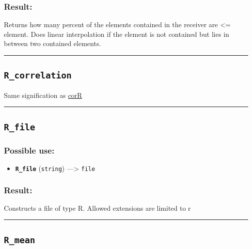 \documentclass[]{book}
\providecommand{\tightlist}{%
  \setlength{\itemsep}{0pt}\setlength{\parskip}{0pt}}
\theoremstyle{definition}
\theoremstyle{definition}
\theoremstyle{definition}
\theoremstyle{remark}
\begin{document}
\subsubsection{Result:}\label{result-411}

Returns how many percent of the elements contained in the receiver are
\textless{}= element. Does linear interpolation if the element is not
contained but lies in between two contained elements.

\begin{center}\rule{0.5\linewidth}{\linethickness}\end{center}

\subsection{\texorpdfstring{\texttt{R\_correlation}}{R\_correlation}}\label{r_correlation}

Same signification as \href{OperatorsBC\#corR}{corR}

\begin{center}\rule{0.5\linewidth}{\linethickness}\end{center}

\subsection{\texorpdfstring{\texttt{R\_file}}{R\_file}}\label{r_file}

\subsubsection{Possible use:}\label{possible-use-426}

\begin{itemize}
\tightlist
\item
  \textbf{\texttt{R\_file}} (\texttt{string}) ---\textgreater{}
  \texttt{file}
\end{itemize}

\subsubsection{Result:}\label{result-412}

Constructs a file of type R. Allowed extensions are limited to r

\begin{center}\rule{0.5\linewidth}{\linethickness}\end{center}

\subsection{\texorpdfstring{\texttt{R\_mean}}{R\_mean}}\label{r_mean}
\end{document}
